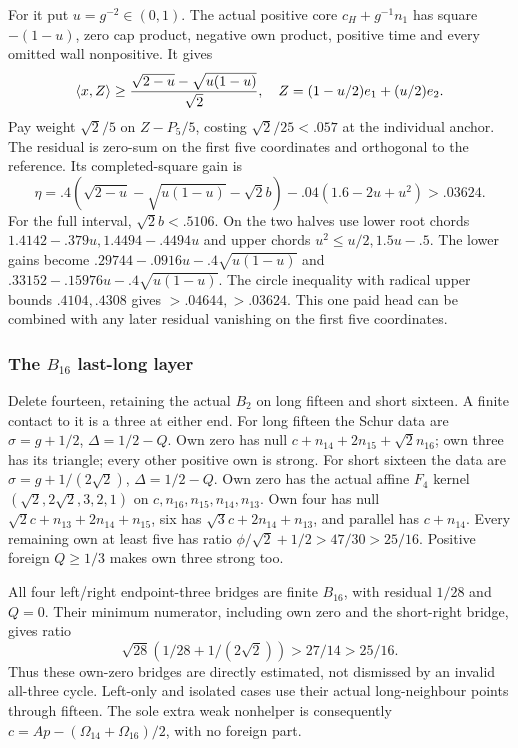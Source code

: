 \documentclass[11pt]{article}
\theoremstyle{definition}
\theoremstyle{remark}
\newcommand{\ip}[2]{\langle #1,#2\rangle}
\begin{document}
For it put \(u=g^{-2}\in(0,1)\). The actual positive core
\(c_H+g^{-1}n_1\) has square \(-(1-u)\), zero cap product,
negative own product, positive time and every omitted wall nonpositive.
It gives
\[
 \ip xZ\ge{\sqrt{2-u}-\sqrt{u(1-u)}\over\sqrt2},
 \quad Z=(1-u/2)e_1+(u/2)e_2.
\]
Pay weight \(\sqrt2/5\) on \(Z-P_5/5\), costing
\(\sqrt2/25<.057\) at the individual anchor. The residual
is zero-sum on the first five coordinates and orthogonal to the
reference. Its completed-square gain is
\[
 \eta=.4(\sqrt{2-u}-\sqrt{u(1-u)}-\sqrt2b)
                  -.04(1.6-2u+u^2)>.03624.
\]
For the full interval, \(\sqrt2b<.5106\). On the two halves use
lower root chords \(1.4142-.379u,1.4494-.4494u\) and upper
chords \(u^2\le u/2,1.5u-.5\). The lower gains become
\(.29744-.0916u-.4\sqrt{u(1-u)}\) and
\(.33152-.15976u-.4\sqrt{u(1-u)}\).
The circle inequality with radical upper bounds \(.4104,.4308\)
gives \(>.04644,>.03624\). This one paid head can be combined
with any later residual vanishing on the first five coordinates.

\subsubsection{The \(B_{16}\) last-long layer}
Delete fourteen, retaining the actual \(B_2\) on long fifteen
and short sixteen. A finite contact to it is a three at either end.
For long fifteen the Schur data are \(\sigma=g+1/2\),
\(\Delta=1/2-Q\). Own zero has null
\(c+n_{14}+2n_{15}+\sqrt2n_{16}\); own three has its triangle;
every other positive own is strong.
For short sixteen the data are \(\sigma=g+1/(2\sqrt2)\),
\(\Delta=1/2-Q\). Own zero has the actual affine \(F_4\)
kernel \((\sqrt2,2\sqrt2,3,2,1)\) on
\(c,n_{16},n_{15},n_{14},n_{13}\). Own four has null
\(\sqrt2c+n_{13}+2n_{14}+n_{15}\), six has
\(\sqrt3c+2n_{14}+n_{13}\), and parallel has \(c+n_{14}\).
Every remaining own at least five has ratio
\(\phi/\sqrt2+1/2>47/30>25/16\). Positive foreign
\(Q\ge1/3\) makes own three strong too.

All four left/right endpoint-three bridges are finite \(B_{16}\),
with residual \(1/28\) and \(Q=0\). Their minimum numerator,
including own zero and the short-right bridge, gives ratio
\[
 \sqrt{28}(1/28+1/(2\sqrt2))>27/14>25/16.
\]
Thus these own-zero bridges are directly estimated, not dismissed
by an invalid all-three cycle. Left-only and isolated cases use
their actual long-neighbour points through fifteen. The sole extra
weak nonhelper is consequently
\(c=Ap-(\Omega_{14}+\Omega_{16})/2\), with no foreign part.
\end{document}
